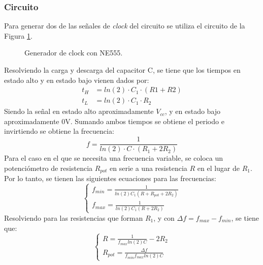 \documentclass[11pt, a4paper]{article}
\begin{document}
\subsubsection{Circuito}
Para generar dos de las señales de \textit{clock} del circuito se utiliza el circuito de la Figura \ref{fig:clock_555}. 
%
\begin{figure}[H]
	\centering
	\caption{Generador de clock con NE555.}
	\label{fig:clock_555}
\end{figure}
%
Resolviendo la carga y descarga del capacitor C, se tiene que los tiempos en estado alto y en estado bajo vienen dados por:
\begin{align}
    t_H &= ln(2) \cdot C_1 \cdot (R1 + R2) \\
    t_L &= ln(2)\cdot C_1 \cdot R_2     
    \label{eq:555_clk_times}
\end{align}
%
Siendo la señal en estado alto aproximadamente $V_{cc}$, y en estado bajo aproximadamente 0V. Sumando ambos tiempos se obtiene el periodo e invirtiendo se obtiene la frecuencia:
%
\begin{equation}
    f=\frac{1}{ln(2) \cdot C \cdot (R_1 + 2R_2)}
    \label{eq:555_clk_freq}
\end{equation}
\label{sec:clk_variable}
%
Para el caso en el que se necesita una frecuencia variable, se coloca un potenci\'ometro de resistencia $R_{pot}$ en serie a una resistencia $R$ en el lugar de $R_1$. Por lo tanto, se tienen las siguientes ecuaciones para las frecuencias:
\begin{equation}
    \begin{cases}
        f_{min} = \frac{1}{ln(2)C_1(R + R_{pot} + 2 R_2) } \\
        f_{max} = \frac{1}{ln(2)C_1(R + 2 R_2)}
    \end{cases}
\end{equation}
\noindent
Resolviendo para las resistencias que forman $R_1$, y con $\Delta f = f_{max} - f_{min}$, se tiene que:
\begin{equation}
    \begin{cases}
    R = \frac{1}{f_{max}ln(2)C} - 2 R_2 \\
    R_{pot} = \frac{\Delta f}{f_{min} f_{max} ln(2) C}
    \end{cases}
    \label{eq:555_var_clk_R}
\end{equation}
%
\end{document}
